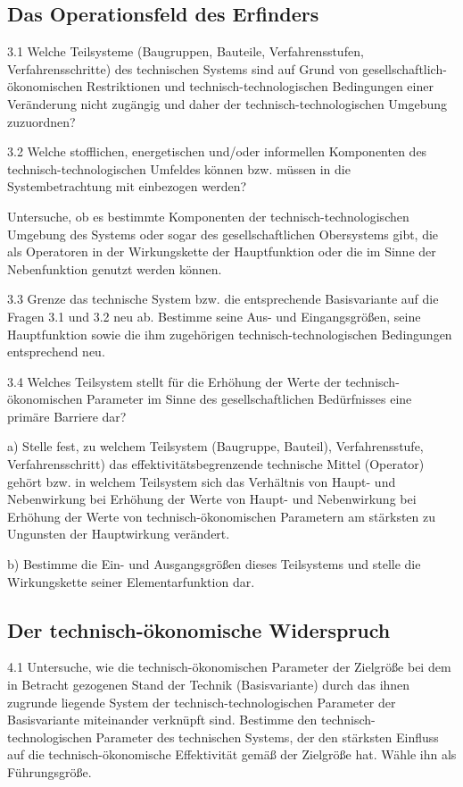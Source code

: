 \documentclass[12pt,a4paper]{article}
\begin{document}
\subsection{Das Operationsfeld des Erfinders}

3.1 Welche Teilsysteme (Baugruppen, Bauteile, Verfahrensstufen,
Verfahrensschritte) des technischen Systems sind auf Grund von
gesellschaftlich-ökonomischen Restriktionen und technisch-technologischen
Bedingungen einer Veränderung nicht zugängig und daher der
technisch-technologischen Umgebung zuzuordnen?

3.2 Welche stofflichen, energetischen und/oder informellen Komponenten des
technisch-technologischen Umfeldes können bzw. müssen in die Systembetrachtung
mit einbezogen werden?

Untersuche, ob es bestimmte Komponenten der technisch-technologischen Umgebung
des Systems oder sogar des gesellschaftlichen Obersystems gibt, die als
Operatoren in der Wirkungskette der Hauptfunktion oder die im Sinne der
Nebenfunktion genutzt werden können.

3.3 Grenze das technische System bzw. die entsprechende Basisvariante auf die
Fragen 3.1 und 3.2 neu ab. Bestimme seine Aus- und Eingangsgrößen, seine
Hauptfunktion sowie die ihm zugehörigen technisch-technologischen Bedingungen
entsprechend neu.

3.4 Welches Teilsystem stellt für die Erhöhung der Werte der
technisch-ökonomischen Parameter im Sinne des gesellschaftlichen Bedürfnisses
eine primäre Barriere dar?

a) Stelle fest, zu welchem Teilsystem (Baugruppe, Bauteil), Verfahrensstufe,
Verfahrensschritt) das effektivitätsbegrenzende technische Mittel (Operator)
gehört bzw. in welchem Teilsystem sich das Verhältnis von Haupt- und
Nebenwirkung bei Erhöhung der Werte von Haupt- und Nebenwirkung bei Erhöhung
der Werte von technisch-ökonomischen Parametern am stärksten zu Ungunsten der
Hauptwirkung verändert.

b) Bestimme die Ein- und Ausgangsgrößen dieses Teilsystems und stelle die
Wirkungskette seiner Elementarfunktion dar.

\subsection{Der technisch-ökonomische Widerspruch}

4.1 Untersuche, wie die technisch-ökonomischen Parameter der Zielgröße bei dem
in Betracht gezogenen Stand der Technik (Basisvariante) durch das ihnen
zugrunde liegende System der technisch-technologischen Parameter der
Basisvariante miteinander verknüpft sind. Bestimme den
technisch-technologischen Parameter des technischen Systems, der den stärksten
Einfluss auf die technisch-ökonomische Effektivität gemäß der Zielgröße hat.
Wähle ihn als Führungsgröße.
\end{document}
